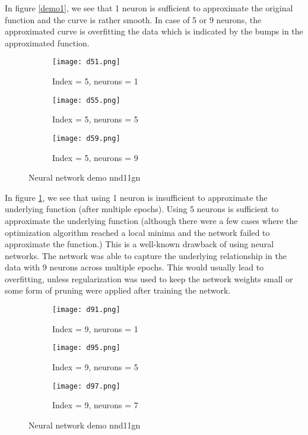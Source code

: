 \documentclass[paper=a4, fontsize=11pt]{scrartcl} %
\numberwithin{equation}{section} %
\begin{document}
In figure \ref{demo1}, we see that 1 neuron is sufficient to approximate the original function and the curve is rather smooth. In case of 5 or 9 neurons, the approximated curve is overfitting the data which is indicated by the bumps in the approximated function. 

\begin{figure}[ht]
\centering
	\begin{subfigure}[b]{0.3\linewidth}
		\centering
		\texttt{[image: d51.png]}
		\caption{Index = 5, neurons = 1}
	\end{subfigure}
	\begin{subfigure}[b]{0.3\linewidth}
		\centering
		\texttt{[image: d55.png]}
		\caption{Index = 5, neurons = 5}
	\end{subfigure}
	\begin{subfigure}[b]{0.3\linewidth}
		\centering
		\texttt{[image: d59.png]}
		\caption{Index = 5, neurons = 9}
	\end{subfigure}
\caption{Neural network demo nnd11gn}
\label{demo2}
\end{figure}

In figure \ref{demo2}, we see that using 1 neuron is insufficient to approximate the underlying function (after multiple epochs). Using 5 neurons is sufficient to approximate the underlying function (although there were a few cases where the optimization algorithm reached a local minima and the network failed to approximate the function.) This is a well-known drawback of using neural networks. The network was able to capture the underlying relationship in the data with 9 neurons across multiple epochs. This would usually lead to overfitting, unless regularization was used to keep the network weights small or some form of pruning were applied after training the network.

\begin{figure}[ht]
\centering
	\begin{subfigure}[b]{0.3\linewidth}
		\centering
		\texttt{[image: d91.png]}
		\caption{Index = 9, neurons = 1}
	\end{subfigure}
	\begin{subfigure}[b]{0.3\linewidth}
		\centering
		\texttt{[image: d95.png]}
		\caption{Index = 9, neurons = 5}
	\end{subfigure}
	\begin{subfigure}[b]{0.3\linewidth}
		\centering
		\texttt{[image: d97.png]}
		\caption{Index = 9, neurons = 7}
	\end{subfigure}
\caption{Neural network demo nnd11gn}
\label{demo3}
\end{figure}
\end{document}
